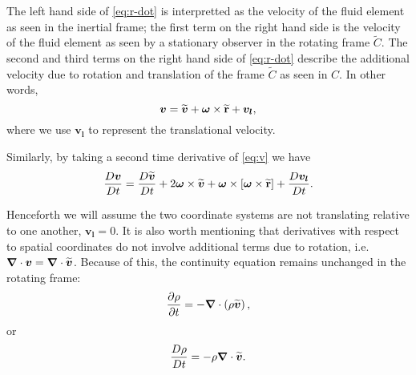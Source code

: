 The left hand side of \ref{eq:r-dot} is interpretted as the velocity
of the fluid element as seen in the inertial frame; the first term on the
right hand side is the velocity of the fluid element as seen by a
stationary observer in the rotating frame \(\widetilde{C}\).  The second
and third terms on the right hand side of \ref{eq:r-dot} describe the
additional velocity due to rotation and translation of the frame
\(\widetilde{C}\) as seen in \(C\).  In other words, 
  \begin{equation}\label{eq:v}
    \boldsymbol{v} = \widetilde{\boldsymbol{v}} + \boldsymbol{\omega}\times\widetilde{{\bf r}} + \boldsymbol{v_l},
  \end{equation}
where we use \(\boldsymbol{v_l}\) to represent the translational velocity.  

Similarly, by taking a second time derivative of \ref{eq:v} we have
  \begin{equation}\label{eq:a}
    \frac{D\boldsymbol{v}}{Dt} = \frac{D\widetilde{\boldsymbol{v}}}{Dt} + 2\boldsymbol{\omega}\times\widetilde{\boldsymbol{v}} + \boldsymbol{\omega}\times\left[\boldsymbol{\omega}\times\widetilde{{\bf r}}\right] + \frac{D\boldsymbol{v_l}}{Dt}.
  \end{equation}

Henceforth we will assume the two coordinate systems are not
translating relative to one another, \(\boldsymbol{v_l} = 0\).  It is
also worth mentioning that derivatives with respect to spatial
coordinates do not involve additional terms due to rotation,
i.e. \(\boldsymbol{\nabla}\cdot\boldsymbol{v} = \boldsymbol{\nabla}\cdot\widetilde{\boldsymbol{v}}\).
Because of this, the continuity equation remains unchanged in the
rotating frame:
  \begin{equation}\label{eq:cont-rot}
    \frac{\partial \rho}{\partial t} = -\boldsymbol{\nabla}\cdot\left(\rho\widetilde{\boldsymbol{v}}\right),
  \end{equation}
or 
  \begin{equation}\label{eq:cont-rot-total}
    \frac{D\rho}{Dt} = -\rho\boldsymbol{\nabla}\cdot\widetilde{\boldsymbol{v}}.
  \end{equation}


